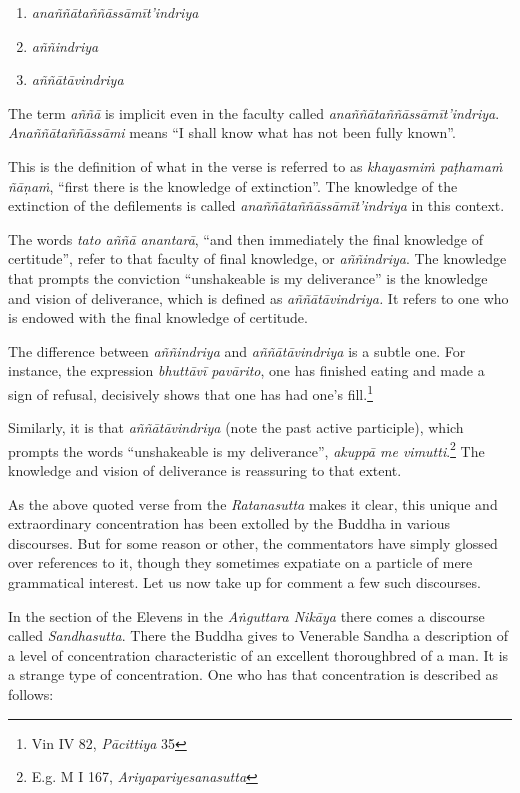 \begin{enumerate}
\def\labelenumi{\arabic{enumi}.}
\tightlist
\item
  \emph{anaññātaññāssāmīt'indriya}
\item
  \emph{aññindriya}
\item
  \emph{aññātāvindriya}
\end{enumerate}

The term \emph{aññā} is implicit even in the faculty called \emph{anaññātaññāssāmīt'indriya}. \emph{Anaññātaññāssāmi} means ``I shall know what has not been fully known''.

This is the definition of what in the verse is referred to as \emph{khayasmiṁ paṭhamaṁ ñāṇaṁ}, ``first there is the knowledge of extinction''. The knowledge of the extinction of the defilements is called \emph{anaññātaññāssāmīt'indriya} in this context.

The words \emph{tato aññā anantarā}, ``and then immediately the final knowledge of certitude'', refer to that faculty of final knowledge, or \emph{aññindriya}. The knowledge that prompts the conviction ``unshakeable is my deliverance'' is the knowledge and vision of deliverance, which is defined as \emph{aññātāvindriya.} It refers to one who is endowed with the final knowledge of certitude.

The difference between \emph{aññindriya} and \emph{aññātāvindriya} is a subtle one. For instance, the expression \emph{bhuttāvī pavārito}, one has finished eating and made a sign of refusal, decisively shows that one has had one's fill.\footnote{Vin IV 82, \emph{Pācittiya} 35}

Similarly, it is that \emph{aññātāvindriya} (note the past active participle), which prompts the words ``unshakeable is my deliverance'', \emph{akuppā me vimutti}.\footnote{E.g. M I 167, \emph{Ariyapariyesanasutta}} The knowledge and vision of deliverance is reassuring to that extent.

As the above quoted verse from the \emph{Ratanasutta} makes it clear, this unique and extraordinary concentration has been extolled by the Buddha in various discourses. But for some reason or other, the commentators have simply glossed over references to it, though they sometimes expatiate on a particle of mere grammatical interest. Let us now take up for comment a few such discourses.

In the section of the Elevens in the \emph{Aṅguttara Nikāya} there comes a discourse called \emph{Sandhasutta}. There the Buddha gives to Venerable Sandha a description of a level of concentration characteristic of an excellent thoroughbred of a man. It is a strange type of concentration. One who has that concentration is described as follows:

